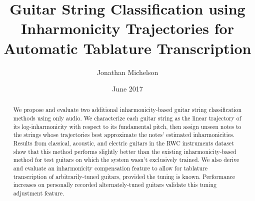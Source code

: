\documentclass[12pt]{cmuthesis}
\begin{document}
 
\frontmatter

\pagestyle{empty}

\title{ %
{\bf Guitar String Classification using Inharmonicity Trajectories for Automatic Tablature Transcription}}
\author{Jonathan Michelson}
\date{June 2017}
\trnumber{}


\support{}
\disclaimer{}



\maketitle


\pagestyle{plain} %


\begin{abstract}
We propose and evaluate two additional inharmonicity-based guitar string classification methods using only audio. We characterize each guitar string as the linear trajectory of its log-inharmonicity with respect to its fundamental pitch, then assign unseen notes to the strings whose trajectories best approximate the notes' estimated inharmonicities. Results from classical, acoustic, and electric guitars in the RWC instruments dataset show that this method performs slightly better than the existing inharmonicity-based method for test guitars on which the system wasn't exclusively trained. We also derive and evaluate an inharmonicity compensation feature to allow for tablature transcription of arbitrarily-tuned guitars, provided the tuning is known. Performance increases on personally recorded alternately-tuned guitars validate this tuning adjustment feature.

\end{abstract}
\end{document}
